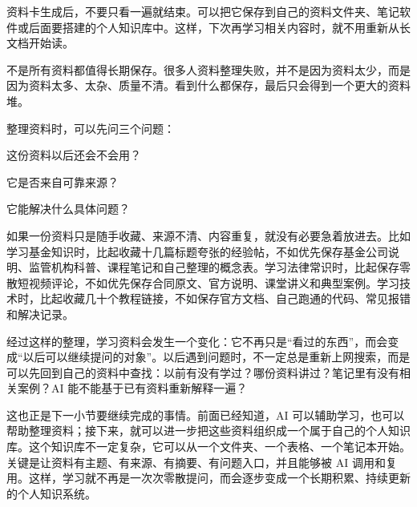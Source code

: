 资料卡生成后，不要只看一遍就结束。可以把它保存到自己的资料文件夹、笔记软件或后面要搭建的个人知识库中。这样，下次再学习相关内容时，就不用重新从长文档开始读。


不是所有资料都值得长期保存。很多人资料整理失败，并不是因为资料太少，而是因为资料太多、太杂、质量不清。看到什么都保存，最后只会得到一个更大的资料堆。

整理资料时，可以先问三个问题：

\begin{tcolorbox}[promptbox]
这份资料以后还会不会用？

它是否来自可靠来源？

它能解决什么具体问题？
\end{tcolorbox}

如果一份资料只是随手收藏、来源不清、内容重复，就没有必要急着放进去。比如学习基金知识时，比起收藏十几篇标题夸张的经验帖，不如优先保存基金公司说明、监管机构科普、课程笔记和自己整理的概念表。学习法律常识时，比起保存零散短视频评论，不如优先保存合同原文、官方说明、课堂讲义和典型案例。学习技术时，比起收藏几十个教程链接，不如保存官方文档、自己跑通的代码、常见报错和解决记录。


经过这样的整理，学习资料会发生一个变化：它不再只是“看过的东西”，而会变成“以后可以继续提问的对象”。以后遇到问题时，不一定总是重新上网搜索，而是可以先回到自己的资料中查找：以前有没有学过？哪份资料讲过？笔记里有没有相关案例？AI 能不能基于已有资料重新解释一遍？

这也正是下一小节要继续完成的事情。前面已经知道，AI 可以辅助学习，也可以帮助整理资料；接下来，就可以进一步把这些资料组织成一个属于自己的个人知识库。这个知识库不一定复杂，它可以从一个文件夹、一个表格、一个笔记本开始。关键是让资料有主题、有来源、有摘要、有问题入口，并且能够被 AI 调用和复用。这样，学习就不再是一次次零散提问，而会逐步变成一个长期积累、持续更新的个人知识系统。



